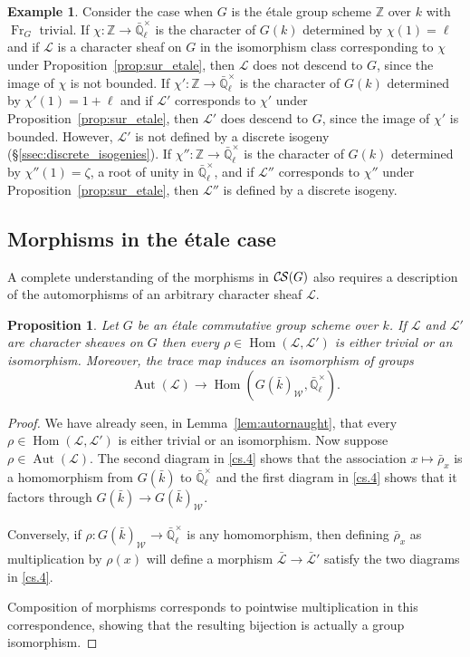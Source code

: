 \documentclass[10pt]{amsart}
\theoremstyle{plain}
\newtheorem{proposition}[theorem]{Proposition}
\theoremstyle{definition}
\newtheorem{example}[theorem]{Example}
\newcommand{\ZZ}{{\mathbb{Z}}}
\newcommand{\EE}{\mathbb{\bar Q}_\ell}
\newcommand{\bFq}{\bar{k}}
\newcommand{\Fq}{k}
\newcommand{\EEx}{\EE^\times}
\newcommand{\Weil}[1]{\mathcal{W}_{#1}}
\newcommand{\Frob}[1]{\operatorname{Fr}_{#1}}
\DeclareMathOperator{\Aut}{Aut}
\DeclareMathOperator{\Hom}{Hom}
\newcommand{\cs}[1]{{\mathcal{#1}}}
\newcommand{\gcs}[1]{{\mathcal{\bar #1}}}
\newcommand{\CS}{{\mathcal{C\hskip-0.8pt S}}}
\newcommand{\brho}{{\bar\rho}}
\begin{document}
\begin{example}\label{eg:}
Consider the case when $G$ is the \'etale group scheme $\ZZ$ over $\Fq$ with $\Frob{G}$ trivial.
If $\chi : \ZZ \to \EEx$ is the character of $G(\Fq)$ determined by $\chi(1) = \ell$
and if $\cs{L}$ is a character sheaf on $G$ in the isomorphism class
corresponding to $\chi$ under Proposition~\ref{prop:sur_etale},
then $\cs{L}$ does not descend to $G$, since the image of $\chi$ is not
bounded.
If $\chi' : \ZZ \to \EEx$ is the character of $G(\Fq)$ determined by $\chi'(1) = 1+\ell$ and if $\cs{L}'$
corresponds to $\chi'$ under Proposition~\ref{prop:sur_etale},
then $\cs{L}'$ does descend to $G$, since the image of $\chi'$ is
bounded.
However, $\cs{L}'$ is not defined by a discrete isogeny (\S \ref{ssec:discrete_isogenies}). 
If $\chi'' : \ZZ \to \EEx$ is the character of $G(\Fq)$ determined by $\chi''(1) = \zeta$, a root of unity in
$\EEx$, and if $\cs{L}''$ corresponds to $\chi''$ under Proposition~\ref{prop:sur_etale},
then $\cs{L}''$ is defined by a discrete isogeny. 
\end{example}

\subsection{Morphisms in the \'etale case}\label{ssec:mor-etale}

A complete understanding of the morphisms in $\CS(G)$ also requires a description of the
automorphisms of an arbitrary character sheaf $\cs{L}$.

\begin{proposition}\label{prop:autornaught_etale}
Let $G$ be an \'etale commutative group scheme over $\Fq$.
If $\cs{L}$ and $\cs{L}'$ are character sheaves on $G$ then
every $\rho\in \Hom(\cs{L},\cs{L}')$ is either trivial or an isomorphism. Moreover, the trace map induces an isomorphism of groups
\[
\Aut(\cs{L}) \to \Hom(G(\bFq)_{\Weil{}}, \EEx).
\]
\end{proposition}

\begin{proof}
We have already seen, in Lemma~\ref{lem:autornaught}, that every $\rho\in \Hom(\cs{L},\cs{L}')$ is either trivial or an isomorphism.
Now suppose $\rho \in \Aut(\cs{L})$.
The second diagram in \ref{cs.4} shows that the association $x \mapsto \brho_x$ is a homomorphism
from $G(\bFq)$ to $\EEx$ and the first diagram in \ref{cs.4} shows that it factors through $G(\bFq) \to G(\bFq)_{\Weil{}}$.  

Conversely, if $\rho : G(\bFq)_{\Weil{}} \to \EEx$ is any homomorphism, then defining $\brho_x$ as multiplication
by $\rho(x)$ will define a morphism $\gcs{L} \to \gcs{L}'$ satisfy the two diagrams in \ref{cs.4}.  

Composition of morphisms corresponds to pointwise multiplication in this correspondence, showing that the
resulting bijection is actually a group isomorphism.
\end{proof}
\end{document}

